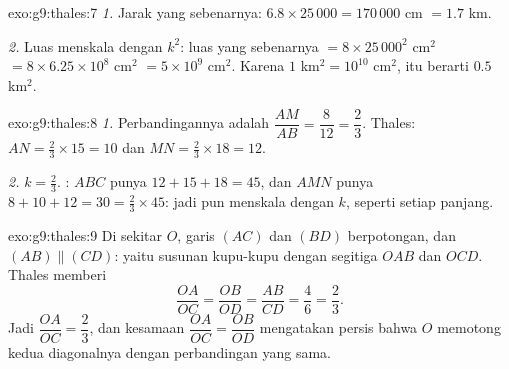 \begin{solution}{exo:g9:thales:7}
\emph{1.} Jarak yang sebenarnya: $6.8 \times 25\,000 = 170\,000$ cm
$= 1.7$ km.

\emph{2.} Luas menskala dengan $k^2$: luas yang sebenarnya
$= 8 \times 25\,000^2$
cm$^2$ $= 8 \times 6.25 \times 10^8$ cm$^2$ $= 5 \times 10^9$ cm$^2$.
Karena $1$ km$^2 = 10^{10}$ cm$^2$, itu berarti $0.5$ km$^2$.
\end{solution}

\begin{solution}{exo:g9:thales:8}
\emph{1.} Perbandingannya adalah $\dfrac{AM}{AB} = \dfrac{8}{12} =
\dfrac23$. Thales: $AN = \frac23 \times 15 = 10$ dan
$MN = \frac23 \times 18 = 12$.

\emph{2.}  $k = \frac23$. : $ABC$ punya
$12 + 15 + 18 = 45$, dan $AMN$ punya $8 + 10 + 12 = 30 = \frac23 \times
45$: jadi  pun menskala dengan $k$, seperti setiap panjang.
\end{solution}

\begin{solution}{exo:g9:thales:9}
Di sekitar $O$, garis $(AC)$ dan $(BD)$ berpotongan, dan
$(AB) \parallel (CD)$: yaitu susunan kupu-kupu dengan segitiga $OAB$
dan $OCD$. Thales memberi
\[
\frac{OA}{OC} = \frac{OB}{OD} = \frac{AB}{CD} = \frac46 = \frac23 .
\]
Jadi $\dfrac{OA}{OC} = \dfrac23$, dan kesamaan
$\dfrac{OA}{OC} = \dfrac{OB}{OD}$ mengatakan persis bahwa $O$ memotong
kedua diagonalnya dengan perbandingan yang sama.
\end{solution}

